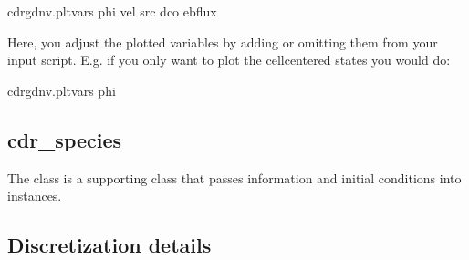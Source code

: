 \documentclass[letterpaper,10pt,english]{sphinxmanual}
\begin{document}
\begin{sphinxVerbatim}[commandchars=\\\{\},formatcom=\scriptsize]
cdr\PYGZus{}gdnv.plt\PYGZus{}vars  phi vel src dco ebflux  
\end{sphinxVerbatim}

Here, you adjust the plotted variables by adding or omitting them from your input script.
E.g. if you only want to plot the cell\sphinxhyphen{}centered states you would do:

\begin{sphinxVerbatim}[commandchars=\\\{\},formatcom=\scriptsize]
cdr\PYGZus{}gdnv.plt\PYGZus{}vars  phi  
\end{sphinxVerbatim}


\subsection{cdr\_species}
\label{\detokenize{CDR:cdr-species}}\label{\detokenize{CDR:chap-cdr-species}}
The  class is a supporting class that passes information and initial conditions into  instances.


\subsection{Discretization details}
\label{\detokenize{CDR:discretization-details}}
\end{document}
